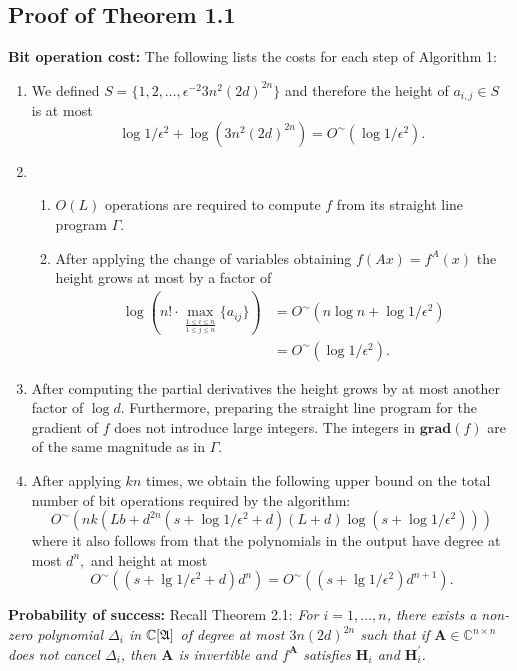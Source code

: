 \documentclass[sigconf]{acmart}
\def\mA{{\bm A}}
\def\C{\mathbb{C}}
\def\grad{\textbf{grad}}
\def\D{\Delta}
\def\A{\frak{A}}
\begin{document}
\subsection{Proof of Theorem 1.1}
%
\textbf{Bit operation cost:} The following lists the costs for each step of Algorithm 1:
%
\begin{enumerate}
    \item We defined $S = \{1,2,\hdots,\epsilon^{-2}3n^2(2d)^{2n}\}$ and therefore the height of $a_{i,j} \in S$ is at most 
    \[
    \log 1/{\epsilon^2} + \log(3n^2(2d)^{2n}) = O^{\sim}(\log 1/{\epsilon^2}).
    \]
    \item 
    \begin{enumerate}[label=\roman*.]
        \item $O(L)$ operations are required to compute $f$ from its straight line program $\Gamma.$
        \item After applying the change of variables obtaining $f(A x)=f^A(x)$ the height grows at most by a factor of
        \begin{align*}
        \log(n!\cdot \max_{\frac{1\leq i\leq n}{1\leq j\leq n}}\{a_{ij}\}) &= 
        O^{\sim}(n\log n + \log 1/{\epsilon^2})\\
        &= O^{\sim}(\log 1/{\epsilon^2}).
        \end{align*}
    \end{enumerate}
    \item After computing the partial derivatives the height grows by at most another factor of $\log d$. Furthermore, preparing the straight line program for the gradient of $f$ does not introduce large integers. The integers in $\grad (f)$ are of the same magnitude as in $\Gamma$.
    \item 
    After applying \cite[Algorithm 2]{SH} $kn$ times, we obtain the
    following upper bound on the total number of bit operations required by the algorithm:
  \[
  O^{\sim}(nk(Lb+d^{2n}(s + \log 1/\epsilon^2+d)(L+d)\log(s + \log 1/\epsilon^2)))
  \]
    where it also follows from \cite[Algorithm 2]{SH} that the polynomials in the output have degree at most $d^n,$ and height at most
  \[
  O^{\sim}((s+\lg 1/\epsilon^2 + d)d^n)
  =O^{\sim}((s+\lg 1/\epsilon^2)d^{n+1}).
  \]
\end{enumerate}
%
\par \noindent 
\textbf{Probability of success:} Recall Theorem 2.1:   \textit{For $i=1,\dots,n$, there exists a non-zero polynomial $\D_i$ in
  $\C[\A]$ of degree at most $3n(2d)^{2n}$ such that if $\mA \in \C^{n\times
    n}$ does not cancel $\D_i$, then $\mA$ is invertible and $f^\mA$
  satisfies $\textbf{H}_i$ and $\textbf{H}_i^{'}$.} 
\end{document}
